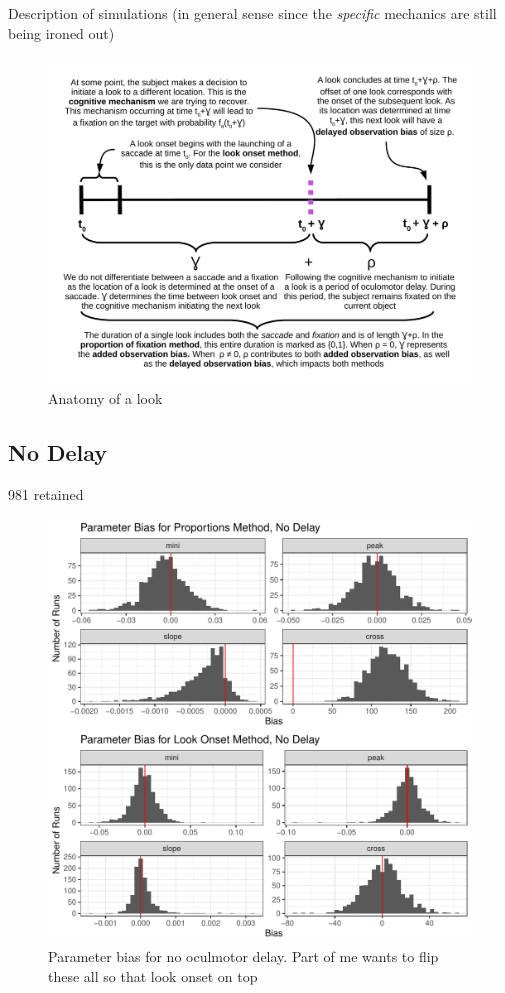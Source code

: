 \documentclass{article}
\begin{document}
Description of simulations (in general sense since the \textit{specific} mechanics are still being ironed out)

\begin{figure}[H]
\centering
\includegraphics[width=\textwidth]{anatomy_of_look.pdf}
\caption{Anatomy of a look}
\label{fig:anatomy_of_look}
\end{figure}


\subsection{No Delay}

981 retained

\begin{figure}[H]
\centering
\includegraphics{no_delay_par_bias.pdf}
\caption{Parameter bias for no oculmotor delay. Part of me wants to flip these all so that look onset on top}
\label{fig:par_bias_no_delay}
\end{figure}
\end{document}
